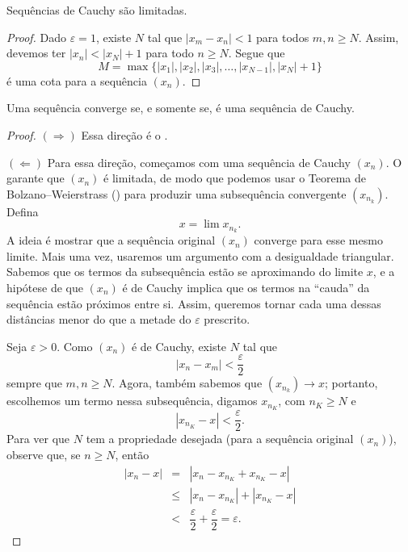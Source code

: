 \begin{lemma}\label{lem:cauchy-limitada}
Sequências de Cauchy são limitadas.
\end{lemma}

\begin{proof}
Dado $\varepsilon = 1$, existe $N$ tal que $|x_m - x_n| < 1$ para todos $m, n \geq N$. Assim, devemos ter $|x_n| < |x_N| + 1$ para todo $n \geq N$. Segue que
\[
M = \max\{|x_1|, |x_2|, |x_3|, \dots, |x_{N-1}|, |x_N| + 1\}
\]
é uma cota para a sequência $(x_n)$.
\end{proof}

 
\begin{theorem}\label{thm:criterio-cauchy}
Uma sequência converge se, e somente se, é uma sequência de Cauchy.
\end{theorem}

\begin{proof}
$(\Rightarrow)$ Essa direção é o .

$(\Leftarrow)$ Para essa direção, começamos com uma sequência de Cauchy $(x_n)$. O  garante que $(x_n)$ é limitada, de modo que podemos usar o Teorema de Bolzano--Weierstrass () para produzir uma subsequência convergente $(x_{n_k})$. Defina
\[
x = \lim x_{n_k}.
\]
A ideia é mostrar que a sequência original $(x_n)$ converge para esse mesmo limite. Mais uma vez, usaremos um argumento com a desigualdade triangular. Sabemos que os termos da subsequência estão se aproximando do limite $x$, e a hipótese de que $(x_n)$ é de Cauchy implica que os termos na ``cauda'' da sequência estão próximos entre si. Assim, queremos tornar cada uma dessas distâncias menor do que a metade do $\varepsilon$ prescrito.

Seja $\varepsilon > 0$. Como $(x_n)$ é de Cauchy, existe $N$ tal que
\[
|x_n - x_m| < \frac{\varepsilon}{2}
\]
sempre que $m, n \geq N$. Agora, também sabemos que $(x_{n_k}) \to x$; portanto, escolhemos um termo nessa subsequência, digamos $x_{n_K}$, com $n_K \geq N$ e
\[
|x_{n_K} - x| < \frac{\varepsilon}{2}.
\]
Para ver que $N$ tem a propriedade desejada (para a sequência original $(x_n)$), observe que, se $n \geq N$, então
\[
\begin{array}{rcl}
|x_n - x| & = & |x_n - x_{n_K} + x_{n_K} - x| \\[0.3cm]
& \leq & |x_n - x_{n_K}| + |x_{n_K} - x| \\[0.3cm]
& < & \dfrac{\varepsilon}{2} + \dfrac{\varepsilon}{2} = \varepsilon.
\end{array}
\]
\end{proof}

